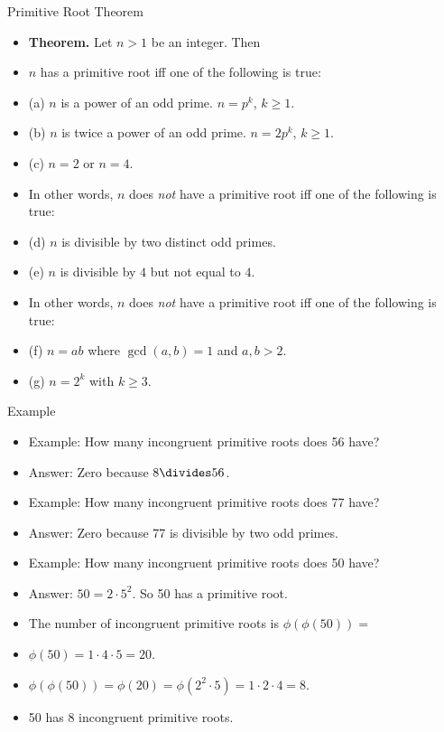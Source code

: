 \documentclass{beamer}
\begin{document}
\begin{frame}{Primitive Root Theorem}

\begin{itemize}
  \item \textbf{Theorem.} Let $n>1$ be an integer. Then
  \item $n$ has a primitive root iff one of the following is true:
  \item (a) $n$ is a power of an odd prime. $n=p^k$, $k\geq 1$.
  \item (b) $n$ is twice a power of an odd prime. $n=2p^k$, $k\geq 1$.
  \item (c) $n=2$ or $n=4$.
  \item In other words, $n$ does \emph{not} have a primitive root iff one of the following is true:
  \item (d) $n$ is divisible by two distinct odd primes.
  \item (e) $n$ is divisible by $4$ but not equal to $4$.
  \item In other words, $n$ does \emph{not} have a primitive root iff one of the following is true:
  \item (f) $n=ab$ where $\gcd(a,b)=1$ and $a,b>2$.
  \item (g) $n=2^k$ with $k\geq 3$.
\end{itemize}

\end{frame}

\begin{frame}{Example}

\begin{itemize}
  \item Example: How many incongruent primitive roots does 56 have?
  \item Answer: Zero because $8\divides 56$.
  \item Example: How many incongruent primitive roots does 77 have?
  \item Answer: Zero because 77 is divisible by two odd primes.
  \item Example: How many incongruent primitive roots does 50 have?
  \item Answer: $50=2\cdot 5^2$. So 50 has a primitive root.
  \item The number of incongruent primitive roots is $\phi(\phi(50))=$
  \item $\phi(50)= 1\cdot4\cdot 5 = 20$.
  \item $\phi(\phi(50))=\phi(20)=\phi(2^2\cdot 5)=1\cdot 2\cdot 4 = 8$.
  \item 50 has 8 incongruent primitive roots.
\end{itemize}

\end{frame}
\end{document}
